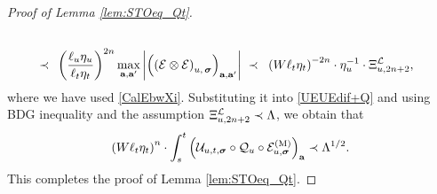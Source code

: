 \documentclass[10pt,reqno]{article}
\theoremstyle{plain} %
\theoremstyle{remark}
\numberwithin{equation}{section}
\begin{document}
\begin{proof}[Proof of Lemma \ref{lem:STOeq_Qt}]
\begin{align}
\nonumber \\\;\prec\;&\;
 \left(\frac{\ell_u \eta_u}{\ell_t \eta_t}\right)^{2n}\max_{\textbf{a},\textbf{a}'}
\left|\left(     \left( \mathcal{E}\otimes  \mathcal{E} \right)_{u, \,\boldsymbol{\sigma}}\right)_{\textbf{a}, \textbf{a}'}\right| \;\prec\;\;
 \left(W \ell_t \eta_t\right)^{-2n}\cdot \eta_u^{-1}\cdot \Xi^{\cal L}_{u,2n+2}, 
\end{align}
where we have used \eqref{CalEbwXi}. Substituting it into \eqref{UEUEdif+Q} and   using  BDG inequality and the  assumption $\Xi^{\cal L}_{u,2n+2}\prec \Lambda$,  we  obtain that  
$$
\left(W \ell_t \eta_t\right)^n \cdot \int_s^t\left(\mathcal{U}_{u, t, \boldsymbol{\sigma}} \circ {\cal Q}_u \circ \mathcal{E}_{u, \boldsymbol{\sigma}}^{(\mathrm{M})}\right)_{\mathbf{a}}  \prec \Lambda ^{1/2}.
$$
This completes the proof of Lemma \ref{lem:STOeq_Qt}. 
 
\end{proof}
 
\end{document}
